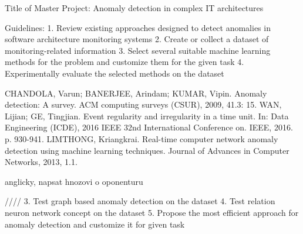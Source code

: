 Title of Master Project: Anomaly detection in complex IT architectures 

Guidelines:
1. Review existing approaches designed to detect anomalies in software architecture monitoring systems
2. Create or collect a dataset of monitoring-related information
3. Select several suitable machine learning methods for the problem and customize them for the given task
4. Experimentally evaluate the selected methods on the dataset


CHANDOLA, Varun; BANERJEE, Arindam; KUMAR, Vipin. Anomaly detection: A survey. ACM computing surveys (CSUR), 2009, 41.3: 15.
WAN, Lijian; GE, Tingjian. Event regularity and irregularity in a time unit. In: Data Engineering (ICDE), 2016 IEEE 32nd International Conference on. IEEE, 2016. p. 930-941.
LIMTHONG, Kriangkrai. Real-time computer network anomaly detection using machine learning techniques. Journal of Advances in Computer Networks, 2013, 1.1.


anglicky, napsat hnozovi o oponenturu





////
3. Test graph based anomaly detection on the dataset
4. Test relation neuron network concept on the dataset
5. Propose the most efficient approach for anomaly detection and customize it for given task
